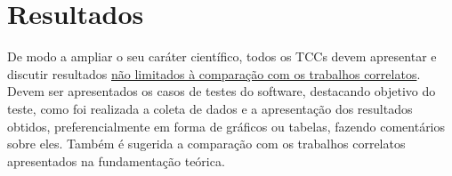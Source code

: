 \section{Resultados}\label{sec:resultados}

De modo a ampliar o seu caráter científico, todos os TCCs devem
apresentar e discutir resultados \ul{não limitados à comparação com os
trabalhos correlatos}. Devem ser apresentados os casos de testes do
software, destacando objetivo do teste, como foi realizada a coleta de
dados e a apresentação dos resultados obtidos, preferencialmente em
forma de gráficos ou tabelas, fazendo comentários sobre eles. Também é
sugerida a comparação com os trabalhos correlatos apresentados na
fundamentação teórica.
